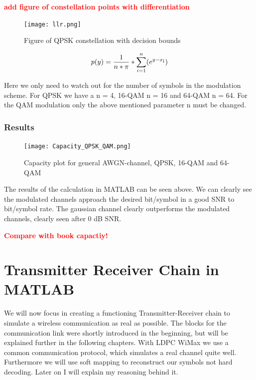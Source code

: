 \documentclass[12pt,oneside, reqno]{report}
\newcommand\boldred[1]{\textcolor{red}{\textbf{#1}}}
\begin{document}
\boldred{add figure of constellation points with differentiation}

\begin{figure}[H]
	\centering
	\texttt{[image: llr.png]}
	\caption{Figure of QPSK constellation with decision bounds}
	\label{fig:llr}
\end{figure}

\begin{equation}
p(y) = \frac{1}{n*\pi}*\sum_{i=1}^n(e^{y-x\textsubscript{i}})
\end{equation} 

Here we only need to watch out for the number of symbols in the modulation scheme. For QPSK we have a n = 4, 16-QAM n = 16 and 64-QAM n = 64.
\newline
For the QAM modulation only the above mentioned parameter n must be changed.
 

\subsection{Results}
\begin{figure}[H]
	\centering
	\texttt{[image: Capacity\_QPSK\_QAM.png]}
	\caption{Capacity plot for general AWGN-channel, QPSK, 16-QAM and 64-QAM}
	\label{fig:capmod}
\end{figure}
The results of the calculation in MATLAB can be seen above. We can clearly see the modulated channels approach the desired bit/symbol in a good SNR to bit/symbol rate. The gaussian channel clearly outperforms the modulated channels, clearly seen after 0 dB SNR.

\boldred{Compare with book capactiy!}


\chapter{Transmitter Receiver Chain in MATLAB}

We will now focus in creating a functioning Transmitter-Receiver chain to simulate a wireless communication as real as possible. The blocks for the communication link were shortly introduced in the beginning, but will be explained further in the following chapters. With LDPC WiMax we use a common communication protocol, which simulates a real channel quite well. Furthermore we will use soft mapping to reconstruct our symbols not hard decoding. Later on I will explain my reasoning behind it.  
\end{document}
